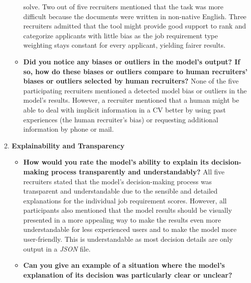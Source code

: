\documentclass[draft,final]{thesisclass} %
\begin{document}
\begin{enumerate}
\begin{itemize}
solve. Two out of five recruiters mentioned that the task was more difficult because the documents were written in non-native English. Three recruiters admitted that the tool might provide good support to rank and categorize applicants with little bias as the job requirement type weighting stays constant for every applicant, yielding fairer results.
        \item \textbf{Did you notice any biases or outliers in the model's output? If so, how do these biases or outliers compare to human recruiters' biases or outliers selected by human recruiters?}
        None of the five participating recruiters mentioned a detected model bias or outliers in the model's results. However, a recruiter mentioned that a human might be able to deal with implicit information in a \acs{CV} better by using past experiences (the human recruiter's bias) or requesting additional information by phone or mail.
    \end{itemize}
    \item \textbf{Explainability and Transparency}
    \begin{itemize}
        \item \textbf{How would you rate the model's ability to explain its decision-making process transparently and understandably?}
        All five recruiters stated that the model's decision-making process was transparent and understandable due to the sensible and detailed explanations for the individual job requirement scores. However, all participants also mentioned that the model results should be visually presented in a more appealing way to make the results even more understandable for less experienced users and to make the model more user-friendly. This is understandable as most decision details are only output in a \textit{JSON} file.
        \item \textbf{Can you give an example of a situation where the model's explanation of its decision was particularly clear or unclear?}

\end{itemize}
\end{enumerate}
\end{document}
